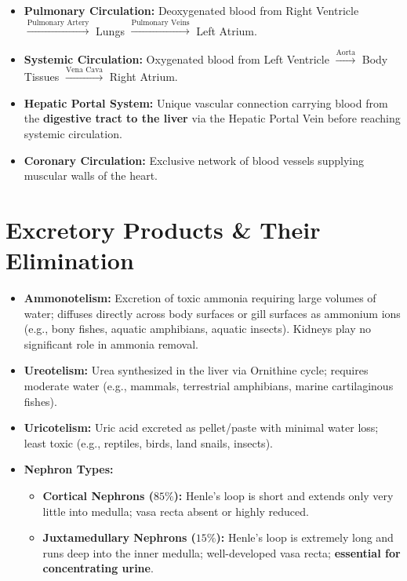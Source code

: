 \documentclass[10pt,a4paper]{article}
\begin{document}
\begin{conceptbox}
\begin{itemize}
  \item \textbf{Pulmonary Circulation:} Deoxygenated blood from Right Ventricle $\xrightarrow{\text{Pulmonary Artery}}$ Lungs $\xrightarrow{\text{Pulmonary Veins}}$ Left Atrium.
  \item \textbf{Systemic Circulation:} Oxygenated blood from Left Ventricle $\xrightarrow{\text{Aorta}}$ Body Tissues $\xrightarrow{\text{Vena Cava}}$ Right Atrium.
  \item \textbf{Hepatic Portal System:} Unique vascular connection carrying blood from the \textbf{digestive tract to the liver} via the Hepatic Portal Vein before reaching systemic circulation.
  \item \textbf{Coronary Circulation:} Exclusive network of blood vessels supplying muscular walls of the heart.
\end{itemize}
\end{conceptbox}

\section{Excretory Products \& Their Elimination}

\begin{conceptbox}
\begin{itemize}
  \item \textbf{Ammonotelism:} Excretion of toxic ammonia requiring large volumes of water; diffuses directly across body surfaces or gill surfaces as ammonium ions (e.g., bony fishes, aquatic amphibians, aquatic insects). Kidneys play no significant role in ammonia removal.
  \item \textbf{Ureotelism:} Urea synthesized in the liver via Ornithine cycle; requires moderate water (e.g., mammals, terrestrial amphibians, marine cartilaginous fishes).
  \item \textbf{Uricotelism:} Uric acid excreted as pellet/paste with minimal water loss; least toxic (e.g., reptiles, birds, land snails, insects).
  \item \textbf{Nephron Types:}
  \begin{itemize}
    \item \textbf{Cortical Nephrons ($85\%$):} Henle's loop is short and extends only very little into medulla; vasa recta absent or highly reduced.
    \item \textbf{Juxtamedullary Nephrons ($15\%$):} Henle's loop is extremely long and runs deep into the inner medulla; well-developed vasa recta; \textbf{essential for concentrating urine}.
  \end{itemize}
\end{itemize}
\end{conceptbox}
\end{document}
